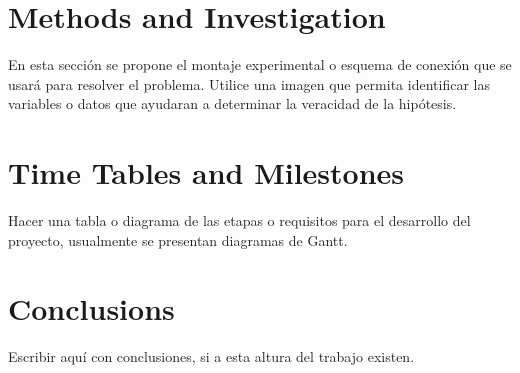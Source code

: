 \documentclass[twocolumns]{IEEEtran}
\begin{document}
\section{Methods and Investigation}
En esta sección se propone el montaje experimental o esquema de conexión que se usará para resolver el problema. Utilice una imagen que permita identificar las variables o datos que ayudaran a determinar la veracidad de la hipótesis.  

\section{Time Tables and Milestones}
Hacer una tabla o diagrama de las etapas o requisitos para el desarrollo del proyecto, usualmente se presentan diagramas de Gantt\cite{mycite2016}.

\section{Conclusions}
Escribir aquí con conclusiones, si a esta altura del trabajo existen. 



\end{document}
